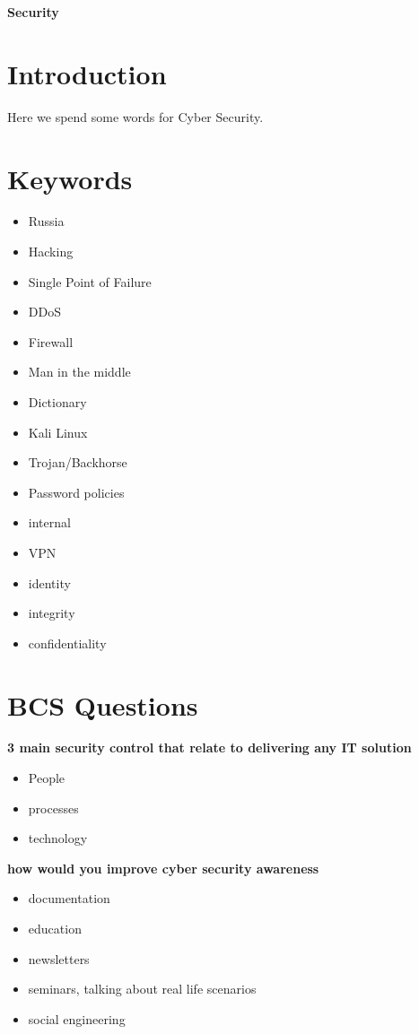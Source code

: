 \documentclass[a4paper,12pt]{article}
\begin{document}
\textbf{Security}


\tableofcontents
\clearpage

 
\section{Introduction}
Here we spend some words for Cyber Security.
\section{Keywords}

\begin{itemize}
\item Russia
\item Hacking
\item Single Point of Failure
\item DDoS
\item Firewall
\item Man in the middle
\item Dictionary
\item Kali Linux
\item Trojan/Backhorse
\item Password policies
\item internal
\item VPN
\item identity 
\item integrity
\item confidentiality
\end{itemize}

\section{BCS Questions}

\textbf {3 main security control that relate to delivering any IT solution}
\begin{itemize}
\item People
\item processes
\item technology 
\end{itemize}


\textbf {how would you improve cyber security awareness}
\begin{itemize}
\item documentation
\item education
\item newsletters
\item seminars, talking about real life scenarios
\item social engineering
\end{itemize}
\end{document}
